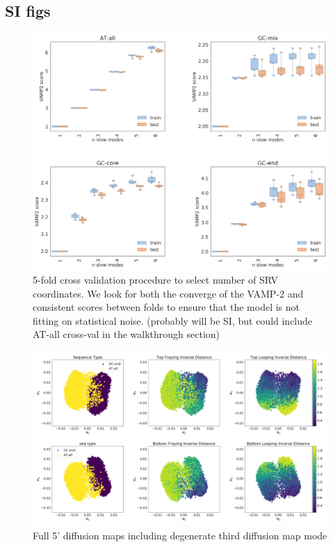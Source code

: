 \documentclass[journal=jpcbfk,manuscript=article]{achemso}
\begin{document}
\subsection{\label{sec:Results}SI figs}

\begin{figure}[ht!]
	\begin{center}
        \includegraphics[width=\textwidth]{Figs/figs_0804/allseq_cross_val_scores_lag-40.png}
        \caption{5-fold cross validation procedure to select number of SRV coordinates. We look for both the converge of the VAMP-2 and consistent scores between folds to ensure that the model is not fitting on statistical noise. (probably will be SI, but could include AT-all cross-val in the walkthrough section)}
        \label{fig:srv_crossval}
	\end{center}
\end{figure}

\begin{figure}[ht!]
	\begin{center}
        \includegraphics[width=\textwidth]{Figs/figs_0804/GC-end_dmaps_full.PNG}
        \caption{Full 5' diffusion maps including degenerate third diffusion map mode}
        \label{fig:GC-end_dmaps_full}
	\end{center}
\end{figure}
\end{document}
